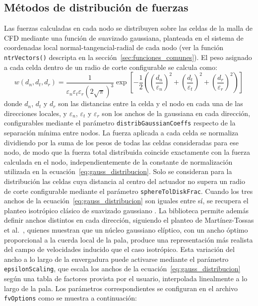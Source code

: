 \subsection{Métodos de distribución de fuerzas}
Las fuerzas calculadas en cada nodo se distribuyen sobre las celdas de la malla de CFD mediante una función de suavizado gaussiana, planteada en el sistema de coordenadas local normal-tangencial-radial de cada nodo (ver la función \texttt{ntrVectors()} descripta en la sección~\ref{sec:funciones_comunes}). El peso asignado a cada celda dentro de un radio de corte configurable se calcula como:
\begin{equation}
w(d_n, d_t, d_r) = \frac{1}{\varepsilon_n \varepsilon_t \varepsilon_r (2\sqrt{\pi})^3} \exp\left[-\frac{1}{2}\left(\left(\frac{d_n}{\varepsilon_n}\right)^2+\left(\frac{d_t}{\varepsilon_t}\right)^2+\left(\frac{d_r}{\varepsilon_r}\right)^2\right)\right]
\label{eq:gauss_distribucion}
\end{equation}
donde $d_n$, $d_t$ y $d_r$ son las distancias entre la celda y el nodo en cada una de las direcciones locales, y $\varepsilon_n$, $\varepsilon_t$ y $\varepsilon_r$ son los anchos de la gaussiana en cada dirección, configurables mediante el parámetro \texttt{distribGaussianCoeffs} respecto de la separación mínima entre nodos. La fuerza aplicada a cada celda se normaliza dividiendo por la suma de los pesos de todas las celdas consideradas para ese nodo, de modo que la fuerza total distribuida coincide exactamente con la fuerza calculada en el nodo, independientemente de la constante de normalización utilizada en la ecuación~\ref{eq:gauss_distribucion}. Solo se consideran para la distribución las celdas cuya distancia al centro del actuador no supera un radio de corte configurable mediante el parámetro \texttt{sphereTolDiskFrac}. Cuando los tres anchos de la ecuación~\ref{eq:gauss_distribucion} son iguales entre sí, se recupera el planteo isotrópico clásico de suavizado gaussiano \citep{sorensen2002}. La biblioteca permite además definir anchos distintos en cada dirección, siguiendo el planteo de Martínez-Tossas et al.~\citep{martinezTossas2017}, quienes muestran que un núcleo gaussiano elíptico, con un ancho óptimo proporcional a la cuerda local de la pala, produce una representación más realista del campo de velocidades inducido que el caso isotrópico. Esta variación del ancho a lo largo de la envergadura puede activarse mediante el parámetro \texttt{epsilonScaling}, que escala los anchos de la ecuación~\ref{eq:gauss_distribucion} según una tabla de factores provista por el usuario, interpolada linealmente a lo largo de la pala.
Los parámetros correspondientes se configuran en el archivo \texttt{fvOptions} como se muestra a continuación:

